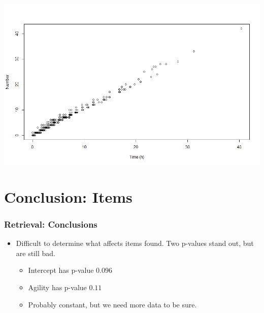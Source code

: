 \documentclass{beamer}
\begin{document}
\begin{frame}
\includegraphics[width=\textwidth]{nitems.png}
\end{frame}


\section{Conclusion: Items}
\begin{frame}
  \frametitle{Retrieval: Conclusions}
  \begin{itemize}
  \item Difficult to determine what affects items found. Two p-values stand out, but are still bad.
    \begin{itemize}
    \item Intercept has p-value $0.096$
    \item Agility has p-value $0.11$
    \item<2-> Probably constant, but we need more data to be sure.
    \end{itemize}
  \end{itemize}
\end{frame}
\end{document}
